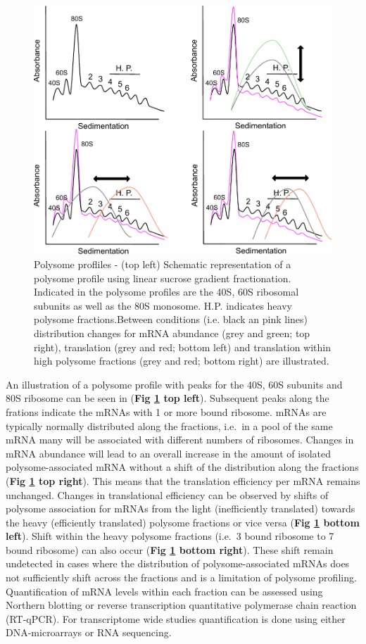 \documentclass[
  12pt,
  openany]{book}
\begin{document}
\begin{figure}
    \includegraphics[width=0.9\linewidth]{./figures/polysome_shifts.pdf}
  \caption{Polysome profliles -  (top left) Schematic representation of a polysome profile using linear sucrose gradient fractionation. Indicated in the polysome profiles are the 40S, 60S ribosomal subunits as well as the 80S monosome. H.P. indicates heavy polysome fractions.Between conditions (i.e. black an pink lines) distribution changes for mRNA abundance (grey and green; top right), translation (grey and red; bottom left) and translation within high polysome fractions (grey and red; bottom right) are illustrated. \label{fig:polysome}}
\end{figure}

An illustration of a polysome profile with peaks for the 40S, 60S subunits and 80S ribosome can be seen in (\textbf{Fig \ref{fig:polysome} top left}). Subsequent peaks along the frations indicate the mRNAs with 1 or more bound ribosome. mRNAs are typically normally distributed along the fractions, i.e.~in a pool of the same mRNA many will be associated with different numbers of ribosomes. Changes in mRNA abundance will lead to an overall increase in the amount of isolated polysome-associated mRNA without a shift of the distribution along the fractions (\textbf{Fig \ref{fig:polysome} top right}). This means that the translation efficiency per mRNA remains unchanged. Changes in translational efficiency can be observed by shifts of polysome association for mRNAs from the light (inefficiently translated) towards the heavy (efficiently translated) polysome fractions or vice versa (\textbf{Fig \ref{fig:polysome} bottom left}). Shift within the heavy polysome fractions (i.e.~3 bound ribosome to 7 bound ribosome) can also occur (\textbf{Fig \ref{fig:polysome} bottom right}). These shift remain undetected in cases where the distribution of polysome-associated mRNAs does not sufficiently shift across the fractions and is a limitation of polysome profiling. Quantification of mRNA levels within each fraction can be assessed using Northern blotting or reverse transcription quantitative polymerase chain reaction (RT-qPCR). For transcriptome wide studies quantification is done using either DNA-microarrays or RNA sequencing.
\end{document}
